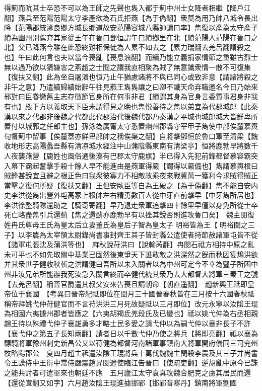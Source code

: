 得薊而阬其士卒恐不可以為王師之先聲也雋入都于薊中州士女降者相繼【降戶江翻】燕兵至范陽范陽太守李產欲為石氏拒燕【為于偽翻】衆莫為用乃帥八城令長出降【范陽郡統涿良鄉方城長鄉道故安范陽容城八縣帥讀曰率】雋復以產為太守產子績為幽州别駕弃其家從王午在魯口鄧恒謂午曰績鄉里在北【績范陽人范陽在魯口之北】父已降燕今雖在此恐終難相保徒為人累不如去之【累力瑞翻去羌呂翻謂殺之也】午曰此何言也夫以當今喪亂【喪息浪翻】而績乃能立義捐家情節之重雖古烈士無以過乃欲以猜嫌害之燕趙之士聞之謂我直相聚為賊了無意識衆情一散不可復集【復扶又翻】此為坐自屠潰也恒乃止午猶慮諸將不與已同心或致非意【謂諸將殺之非午之意】乃遣績歸績始辭午往見燕王雋雋讓之曰卿不識天命弃職邀名今日乃始來邪對曰臣眷戀舊主志存徵節官身所在何事非君【績謂其身為官身言委質事君身非我有也】殿下方以義取天下臣未謂得見之晩也雋悦善待之雋以弟宜為代郡城郎【此秦漢以來之代郡非後魏之代都此代郡治代後魏代都乃秦漢之平城也城郎城大皆鮮卑所置付以城郭之任郎主也】孫泳為廣甯太守悉置幽州郡縣守宰甲子雋使中部俟釐慕輿句督薊中留事【俟釐蓋亦鮮卑部帥之稱俟渠之翻】自將擊鄧恒於魯口軍至清梁【魏收地形志高陽蠡吾縣有清凉城水經注中山蒲陰縣東南有清梁亭】恒將鹿勃早將數千人夜襲燕營【鹿姓也風俗通後漢有巴郡太守鹿旗】半已得入先犯前鋒都督慕容霸突入幕下霸起奮擊手殺十餘人早不能進由是燕軍得嚴【謂得以嚴備也】雋謂慕輿根曰賊鋒甚銳宜且避之根正色曰我衆彼寡力不相敵故乘夜來戰冀萬一獲利今求賊得賊正當擊之復何所疑【復扶又翻】王但安臥臣等自為王破之【為于偽翻】雋不能自安内史李洪從雋出營外屯高冢上根帥左右精勇數百人從中牙直前擊早【中牙雋所居也】李洪徐整騎隊還助之【騎奇寄翻】早乃退走衆軍追擊四十餘里早僅以身免所從士卒死亡略盡雋引兵還薊【雋之還薊亦鹿勃早有以挫其銳否則進攻魯口矣】　魏主閔復姓冉氏尊母王氏為皇太后立妻董氏為皇后子智為皇太子明裕皆為王【明裕閔之三子】以李農為太宰領太尉錄尚書事封齊王其子皆封縣公遣使者持節赦諸軍屯皆不從【諸軍屯張沈及蒲洪等也】　麻秋說苻洪曰【說輸芮翻】冉閔石祗方相持中原之亂未可平也不如先取關中基業已固然後東爭天下誰敢敵之洪深然之旣而秋因宴鴆洪欲并其衆世子健收秋斬之洪謂健曰吾所以未入關者以為中州可定今不幸為豎子所困中州非汝兄弟所能辦我死汝急入關言終而卒健代統其衆乃去大都督大將軍三秦王之號【去羌呂翻】稱晉官爵遣其叔父安來告喪且請朝命【朝直遥翻】　趙新興王祗即皇帝位于襄國　【考異曰晉帝紀祗即位在閏月三十國晉春秋皆在三月按十六國春秋祗稱帝拜姚弋仲苻健官而不言苻洪洪三月死故疑祗以三月即位】改元永寧以汝隂王琨為相國六夷據州郡者皆應之【六夷胡羯氐羌段氏及已蠻也】祗以姚弋仲為右丞相親趙王待以殊禮弋仲子襄雄勇多才略士民多愛之請弋仲以為嗣弋仲以襄非長子不許【襄弋仲之第五子長知兩翻】請者日以千數弋仲乃使之將兵【將即亮翻】祗以襄為驃騎將軍豫州刺史新昌公又以苻健為都督河南諸軍事鎮南大將軍開府儀同三司兖州牧略陽郡公　夏四月趙主祗遣汝陰王琨將兵十萬伐魏魏主閔殺李農及其三子并尚書令王謨侍中王衍中常侍嚴震趙昇閔遣使臨江告晉曰【使疏吏翻】逆胡亂中原今已誅之能共討者可遣軍來也朝廷不應　五月廬江太守袁真攻魏合肥克之虜其居民而還【還從宣翻又如字】六月趙汝陰王琨進據邯鄲【邯鄲音寒丹】鎮南將軍劉國

